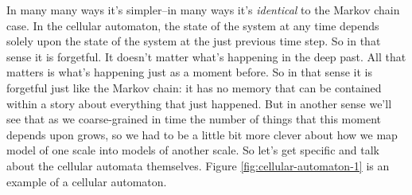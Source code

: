 \documentclass[]{article}
\begin{document}
In many many ways it's simpler--in many ways it's \emph{identical} to the Markov chain case. In the cellular automaton, the state of the system at any time depends solely upon the state of the system at the just previous time step.
So in that sense it is forgetful.
It doesn't matter what's happening in the deep past.
All that matters is what's happening just as a moment before.
So in that sense it is forgetful just like the Markov chain: it has no memory that can be contained within a story about everything that just happened.
But in another sense we'll see that as we coarse-grained in time the number of things that this moment depends upon grows, so we had to be a little bit more clever about how we map model of one scale into models of another scale. 
So let's get specific and talk about the cellular automata themselves.
Figure \ref{fig:cellular-automaton-1} is an example of  a cellular automaton.
\end{document}
